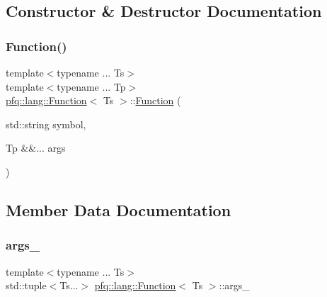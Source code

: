 \subsection{Constructor \& Destructor Documentation}
\mbox{\label{structpfq_1_1lang_1_1Function_a262782ac0fc302fb2c1ce704e272a7a1}} 
\subsubsection{\texorpdfstring{Function()}{Function()}}
{\footnotesize\ttfamily template$<$typename ... Ts$>$ \\
template$<$typename ... Tp$>$ \\
\hyperlink{structpfq_1_1lang_1_1Function}{pfq\+::lang\+::\+Function}$<$ Ts $>$\+::\hyperlink{structpfq_1_1lang_1_1Function}{Function} (\begin{DoxyParamCaption}\item[{std\+::string}]{symbol,  }\item[{Tp \&\&...}]{args }\end{DoxyParamCaption})\hspace{0.3cm}{\ttfamily [inline]}}



\subsection{Member Data Documentation}
\mbox{\label{structpfq_1_1lang_1_1Function_a1451f8a19d96e0d3e2885f3b7278c8d3}} 
\subsubsection{\texorpdfstring{args\+\_\+}{args\_}}
{\footnotesize\ttfamily template$<$typename ... Ts$>$ \\
std\+::tuple$<$Ts...$>$ \hyperlink{structpfq_1_1lang_1_1Function}{pfq\+::lang\+::\+Function}$<$ Ts $>$\+::args\+\_\+}

\mbox{\label{structpfq_1_1lang_1_1Function_a603c829dffbee5b0cd1900672cf68492}} 
